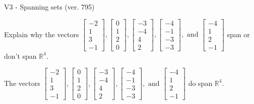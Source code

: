 \begin{exercise}
  \begin{exerciseTitle}V3 - Spanning sets (ver. 795)\end{exerciseTitle}
  \begin{exerciseStatement}
    Explain why the vectors \(\left[\begin{array}{r}
-2 \\
1 \\
3 \\
-1
\end{array}\right] , \left[\begin{array}{r}
0 \\
1 \\
2 \\
0
\end{array}\right] , \left[\begin{array}{r}
-3 \\
-4 \\
4 \\
2
\end{array}\right] , \left[\begin{array}{r}
-4 \\
-1 \\
-3 \\
-3
\end{array}\right] , \text{ and } \left[\begin{array}{r}
-4 \\
1 \\
2 \\
-1
\end{array}\right]\) span or don't span \(\mathbb{R}^4\). 
	


  \end{exerciseStatement}
  \begin{exerciseAnswer}
   The vectors \(\left[\begin{array}{r}
-2 \\
1 \\
3 \\
-1
\end{array}\right] , \left[\begin{array}{r}
0 \\
1 \\
2 \\
0
\end{array}\right] , \left[\begin{array}{r}
-3 \\
-4 \\
4 \\
2
\end{array}\right] , \left[\begin{array}{r}
-4 \\
-1 \\
-3 \\
-3
\end{array}\right] , \text{ and } \left[\begin{array}{r}
-4 \\
1 \\
2 \\
-1
\end{array}\right]\) 
  	 do  
	span \(\mathbb{R}^4\).
  



\end{exerciseAnswer}
\end{exercise}
